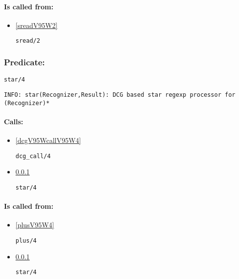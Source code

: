 \paragraph{Is called from:} 
\begin{itemize}
\item \ref{sreadV95W2} 
\begin{verbatim}
sread/2
\end{verbatim}

\end{itemize}

\subsubsection{Predicate:} \label{starV95W4}

\begin{verbatim}
star/4
\end{verbatim}

{\small \begin{verbatim}
INFO: star(Recognizer,Result): DCG based star regexp processor for (Recognizer)*

\end{verbatim}}
\paragraph{Calls:} 
\begin{itemize}
\item \ref{dcgV95WcallV95W4} 
\begin{verbatim}
dcg_call/4
\end{verbatim}

\item \ref{starV95W4} 
\begin{verbatim}
star/4
\end{verbatim}

\end{itemize}
\paragraph{Is called from:} 
\begin{itemize}
\item \ref{plusV95W4} 
\begin{verbatim}
plus/4
\end{verbatim}

\item \ref{starV95W4} 
\begin{verbatim}
star/4
\end{verbatim}

\end{itemize}


